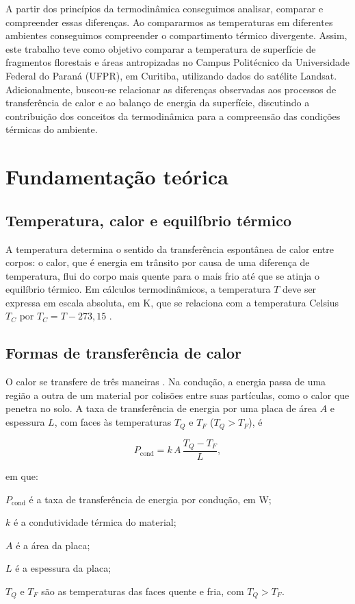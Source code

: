 \documentclass[
12pt,			%
openany,		%
oneside,		%
a4paper,		%
sumario=tradicional,
chapter=TITLE,
section=TITLE,
subsection=Title,
brazil,			%
]{abntex2}
\begin{document}
	A partir dos princípios da termodinâmica conseguimos analisar, comparar e compreender essas diferenças. Ao compararmos as temperaturas em diferentes ambientes conseguimos compreender o compartimento térmico divergente. Assim, este trabalho teve como objetivo comparar a temperatura de superfície de fragmentos florestais e áreas antropizadas no Campus Politécnico da Universidade Federal do Paraná (UFPR), em Curitiba, utilizando dados do satélite Landsat. Adicionalmente, buscou-se relacionar as diferenças observadas aos processos de transferência de calor e ao balanço de energia da superfície, discutindo a contribuição dos conceitos da termodinâmica para a compreensão das condições térmicas do ambiente.

	
	\chapter{Fundamentação teórica}
	
	\section{Temperatura, calor e equilíbrio térmico}
	
	A temperatura determina o sentido da transferência espontânea de calor entre corpos: o calor, que é energia em trânsito por causa de uma diferença de temperatura, flui do corpo mais quente para o mais frio até que se atinja o equilíbrio térmico. Em cálculos termodinâmicos, a temperatura $T$ deve ser expressa em escala absoluta, em \si{\kelvin}, que se relaciona com a temperatura Celsius $T_C$ por $T_C = T - 273{,}15$ \cite{halliday}.
	
	\section{Formas de transferência de calor}\label{sec:transferencia}
	
	O calor se transfere de três maneiras \cite{halliday}. Na condução, a energia passa de uma região a outra de um material por colisões entre suas partículas, como o calor que penetra no solo. A taxa de transferência de energia por uma placa de área $A$ e espessura $L$, com faces às temperaturas $T_Q$ e $T_F$ ($T_Q > T_F$), é
	
		\begin{equation}
		P_{\mathrm{cond}} = k \, A \, \frac{T_Q - T_F}{L},
	\end{equation}
	
	\noindent em que:
	\begin{alineas}
		\item $P_{\mathrm{cond}}$ é a taxa de transferência de energia por condução, em \si{\watt};
		\item $k$ é a condutividade térmica do material;
		\item $A$ é a área da placa;
		\item $L$ é a espessura da placa;
		\item $T_Q$ e $T_F$ são as temperaturas das faces quente e fria, com $T_Q > T_F$.
	\end{alineas}
	
\end{document}
